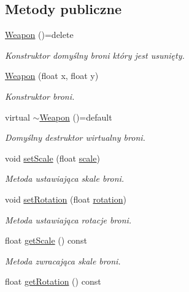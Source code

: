 \subsection*{Metody publiczne}
\begin{DoxyCompactItemize}
\item 
\mbox{\hyperlink{class_weapon_afe032e854c543fe393fda4e3e6b9fafc}{Weapon}} ()=delete
\begin{DoxyCompactList}\small\item\em Konstruktor domyślny broni który jest usunięty. \end{DoxyCompactList}\item 
\mbox{\hyperlink{class_weapon_a0640cf23068ebf732ce564329e5c40f4}{Weapon}} (float x, float y)
\begin{DoxyCompactList}\small\item\em Konstruktor broni. \end{DoxyCompactList}\item 
virtual \mbox{\hyperlink{class_weapon_af06462587d8fd8878be4af2a2479f9bb}{$\sim$\+Weapon}} ()=default
\begin{DoxyCompactList}\small\item\em Domyślny destruktor wirtualny broni. \end{DoxyCompactList}\item 
void \mbox{\hyperlink{class_weapon_ae7f10f6f35f5b1cc4e073530841ade5d}{set\+Scale}} (float \mbox{\hyperlink{class_weapon_a425a9f9fc4bb9bf0e4de80855d3e2ac0}{scale}})
\begin{DoxyCompactList}\small\item\em Metoda ustawiająca skale broni. \end{DoxyCompactList}\item 
void \mbox{\hyperlink{class_weapon_a057b4129e261b70f3a12703e475da353}{set\+Rotation}} (float \mbox{\hyperlink{class_weapon_aea591386a659ecf7dd7e41ada97db990}{rotation}})
\begin{DoxyCompactList}\small\item\em Metoda ustawiająca rotacje broni. \end{DoxyCompactList}\item 
float \mbox{\hyperlink{class_weapon_ac7ab3d1fc902d0a063d5c447ebda674b}{get\+Scale}} () const
\begin{DoxyCompactList}\small\item\em Metoda zwracająca skale broni. \end{DoxyCompactList}\item 
float \mbox{\hyperlink{class_weapon_af16afbd2da86bee0e48680e962abeca5}{get\+Rotation}} () const

\end{DoxyCompactItemize}
